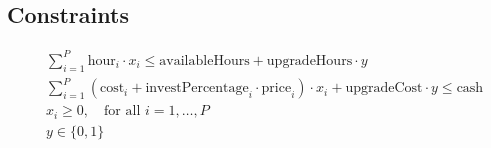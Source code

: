 \documentclass{article}
\begin{document}
\subsection*{Constraints}
\begin{align}
    &\sum_{i=1}^{P} \text{hour}_i \cdot x_i \leq \text{availableHours} + \text{upgradeHours} \cdot y \\
    &\sum_{i=1}^{P} (\text{cost}_i + \text{investPercentage}_i \cdot \text{price}_i) \cdot x_i + \text{upgradeCost} \cdot y \leq \text{cash} \\
    &x_i \geq 0, \quad \text{for all } i = 1, \dots, P \\
    &y \in \{0, 1\}
\end{align}
\end{document}
